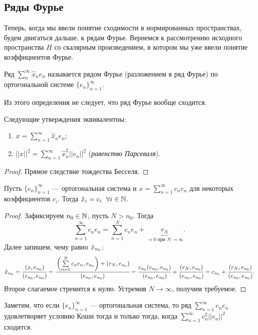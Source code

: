 \documentclass[a4paper, 12pt]{article}
\begin{document}
\subsection{Ряды Фурье}
Теперь, когда мы ввели понятие сходимости в нормированных пространствах, будем двигаться дальше, к рядам Фурье. Вернемся к рассмотрению исходного пространства $H$ со скалярным произведением, в котором мы уже ввели понятие коэффициентов Фурье.
\begin{Def}
    Ряд $\sum\limits_{n}^{\infty} \hat{x}_ne_n$ называется рядом Фурье (разложением в ряд Фурье) по ортогональной системе $\{e_n\}_{n=1}^{\infty}$.
\end{Def}
Из этого определения не следует, что ряд Фурье вообще сходится.
\begin{Statement}
    Следующие утверждения эквивалентны:
    \begin{enumerate}
        \item $x = \sum\limits_{n=1}^{\infty} \hat{x}_ne_n$;
        \item $||x||^2 = \sum\limits_{n=1}^{\infty} \hat{x}^2_n ||e_n||^2$ (\textit{равенство Парсеваля}).
    \end{enumerate}
\end{Statement}
\begin{proof}
    Прямое следствие тождества Бесселя.
\end{proof}
\begin{Statement}
    Пусть $\{e_n\}_{n=1}^{\infty}$ --- ортогональная система и $x = \sum\limits_{n=1}^{\infty}c_n e_n$ для некоторых коэффициентов $c_i$. Тогда $\hat{x}_i = c_i\;\ \forall i \in \mathbb{N}$.
\end{Statement}
\begin{proof}
    Зафиксируем $n_0\in \mathbb{N}$, пусть $N>n_0$. Тогда
    $$
        \sum\limits_{n=1}^{\infty} c_ne_n = \sum \limits_{n=1}^{N}c_n e_n + \underbrace{r_N}_{\to 0 \text{ при } N\to \infty}.
    $$
    Далее запишем, чему равно $\hat{x}_{n_0}$:
    $$
        \hat{x}_{n_0} = \cfrac{(x,e_{n_0})}{(e_{n_0}, e_{n_0})} = \cfrac{\left(\sum\limits_{n=1}^{N} c_ne_n, e_{n_0}\right) + \left(r_N, e_{n_0}\right)}{(e_{n_0}, e_{n_0})} = \cfrac{c_{n_0}(e_{n_0}, e_{n_0})}{(e_{n_0}, e_{n_0})} + \cfrac{(r_N, e_{n_0})}{(e_{n_0}, e_{n_0})} = c_{n_0} + \cfrac{(r_N, e_{n_0})}{(e_{n_0}, e_{n_0})}.
    $$
    Второе слагаемое стремится к нулю. Устремив $N \to \infty$, получим требуемое.
\end{proof}
Заметим, что если $\{e_n\}_{n=1}^{\infty}$ --- ортогональная система, то ряд $\sum\limits_{n=1}^{\infty} c_n e_n$ удовлетворяет условию Коши тогда и только тогда, когда $\sum\limits_{n=1}^{\infty}c_n^2||e_n||^2$ сходится.
\end{document}
